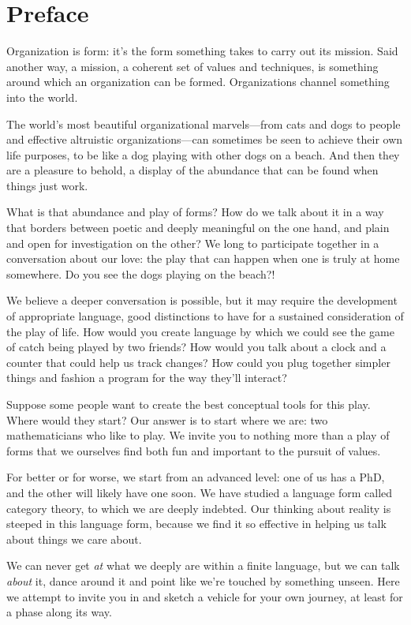 \documentclass[DynamicalBook]{subfiles}
\begin{document}
%


\setcounter{chapter}{0}%


\chapter{Preface}\label{chapter.0}

Organization is form: it's the form something takes to carry out its mission. Said another way, a mission, a coherent set of values and techniques, is something around which an organization can be formed. Organizations channel something into the world.

 The world's most beautiful organizational marvels---from cats and dogs to people and effective altruistic organizations---can sometimes be seen to achieve their own life purposes, to be like a dog playing with other dogs on a beach. And then they are a pleasure to behold, a display of the abundance that can be found when things just work.

What is that abundance and play of forms? How do we talk about it in a way that borders between poetic and deeply meaningful on the one hand, and plain and open for investigation on the other? We long to participate together in a conversation about our love: the play that can happen when one is truly at home somewhere. Do you see the dogs playing on the beach?!

We believe a deeper conversation is possible, but it may require the development of appropriate language, good distinctions to have for a sustained consideration of the play of life. How would you create language by which we could see the game of catch being played by two friends? How would you talk about a clock and a counter that could help us track changes? How could you  plug together simpler things and fashion a program for the way they'll interact?

Suppose some people want to create the best conceptual tools for this play. Where would they start? Our answer is to start where we are: two mathematicians who like to play. We invite you to nothing more than a play of forms that we ourselves find both fun and important to the pursuit of  values.

For better or for worse, we start from an advanced level: one of us has a PhD, and the other will likely have one soon. We have studied a language form called category theory, to which we are deeply indebted. Our thinking about reality is steeped in this language form, because we find it so effective in helping us talk about things we care about.

We can never get \emph{at} what we deeply are within a finite language, but we can talk \emph{about} it, dance around it and point like we're touched by something unseen. Here we attempt to invite you in and sketch a vehicle for your own journey, at least for a phase along its way. 
\end{document}
